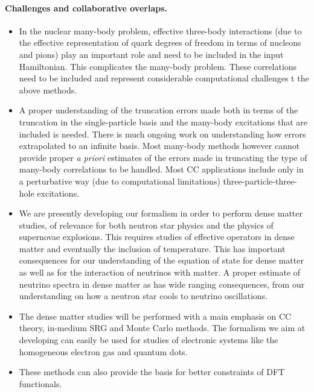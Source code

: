 \documentclass[a4wide,10pt]{article}
\begin{document}
\noindent
\paragraph{Challenges and collaborative overlaps.}
\begin{itemize}
\item In the nuclear many-body problem, effective three-body interactions (due to the effective representation of quark degrees of freedom in terms of nucleons and pions) play an important role and need to be included in the input Hamiltonian. This complicates the many-body problem. These correlations need to be included and represent considerable computational challenges t the above methods.

\item A proper understanding  of the truncation errors made both in terms of the truncation in the single-particle basis and the many-body excitations that are included is needed. There is much ongoing work on understanding how errors extrapolated to an infinite basis. Most many-body methods however cannot provide proper \emph{a priori} estimates of the errors made in truncating the type of many-body correlations to be handled. Most CC applications include only in a perturbative way (due to computational limitations) three-particle-three-hole excitations. 

\item We are presently developing our formalism in order to perform dense matter studies, of relevance for both neutron star physics and the physics of supernovae explosions. This requires studies of effective operators in dense matter and eventually the inclusion of temperature. This has important consequences for our understanding of the equation of state for dense matter as well as for the interaction of neutrinos with matter. A proper estimate of neutrino spectra in dense matter as has wide ranging consequences, from our understanding on how a neutron star cools to neutrino oscillations. 

\item The dense matter studies will be performed with a main emphasis on CC theory, in-medium SRG and Monte Carlo methods. The formalism we aim at developing can easily be used for studies of electronic systems like the homogeneous electron gas and quantum dots. 

\item These methods can also provide the basis for better constraints of DFT functionals.
\end{itemize}
\end{document}
